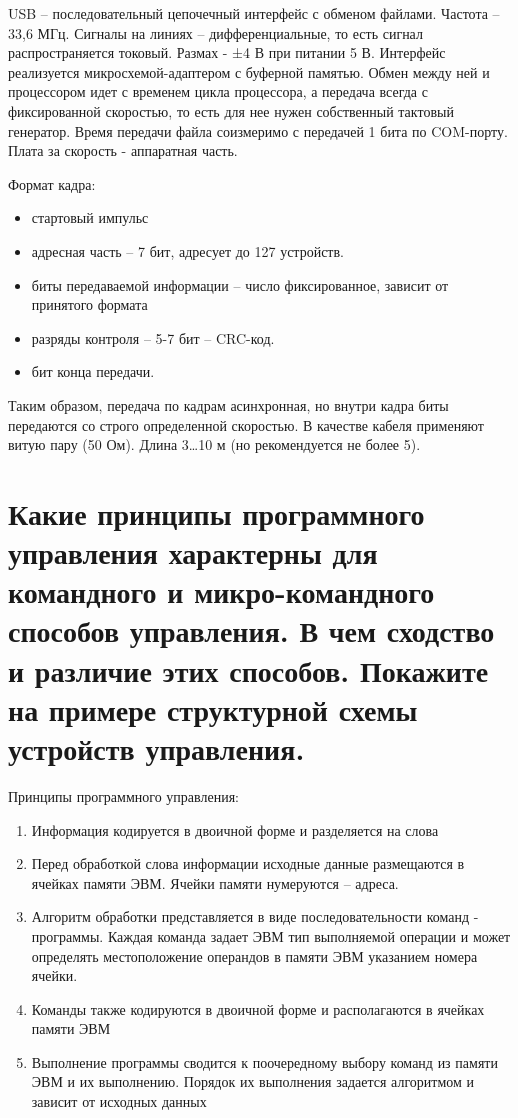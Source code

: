 \documentclass[unicode, 12pt, a4paper, oneside]{article}
\begin{document}
USB – последовательный цепочечный интерфейс с обменом файлами. Частота – 33,6 МГц. Сигналы на линиях – дифференциальные, то есть сигнал распространяется токовый. Размах - ±4 В при питании 5 В. Интерфейс реализуется микросхемой-адаптером с буферной памятью. Обмен между ней и процессором идет с временем цикла процессора, а передача всегда с фиксированной скоростью, то есть для нее нужен собственный тактовый генератор. Время передачи файла соизмеримо с передачей 1 бита по COM-порту. Плата за  скорость - аппаратная часть.

Формат кадра:
\begin{itemize}
\item стартовый импульс
\item адресная часть – 7 бит, адресует до 127 устройств.
\item биты передаваемой информации – число фиксированное, зависит от принятого формата
\item разряды контроля – 5-7 бит – CRC-код.
\item бит конца передачи.
\end{itemize}

Таким образом, передача по кадрам асинхронная, но внутри кадра биты передаются со строго определенной скоростью. В качестве кабеля применяют витую пару (50 Ом). Длина 3…10 м (но рекомендуется не более 5).

\section{Какие принципы программного управления характерны для командного и микро-командного способов управления. В чем сходство и различие этих способов. Покажите на примере структурной схемы устройств управления.}

Принципы программного управления:
\begin{enumerate}
\item Информация кодируется в двоичной форме и разделяется на слова
\item Перед обработкой слова информации исходные данные размещаются в ячейках памяти ЭВМ. Ячейки памяти нумеруются – адреса.
\item Алгоритм обработки представляется в виде последовательности команд - программы. Каждая команда задает ЭВМ тип выполняемой операции и может определять местоположение операндов в памяти ЭВМ указанием  номера ячейки.
\item Команды также кодируются в двоичной форме и располагаются в ячейках памяти ЭВМ
\item Выполнение программы сводится к поочередному выбору команд из памяти ЭВМ и их выполнению. Порядок их выполнения задается алгоритмом и зависит от исходных данных
\end{enumerate}
\end{document}
